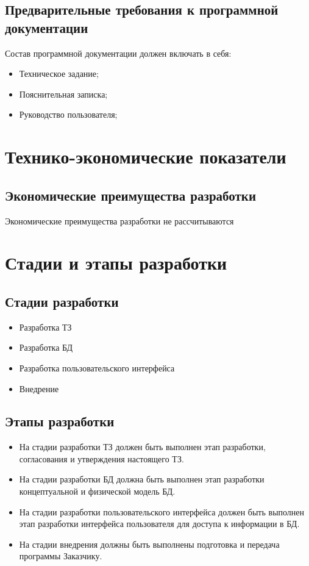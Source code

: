   \subsection{Предварительные требования к программной документации}
    Состав программной документации должен включать в себя:
    \begin{itemize}
    \item Техническое задание;
    \item Пояснительная записка;
    \item Руководство пользователя;
    \end{itemize}
\section{Технико-экономические показатели}
  \subsection{Экономические преимущества разработки}
    Экономические преимущества разработки не рассчитываются 
\section{Стадии и этапы разработки}
  \subsection{Стадии разработки}
   \begin{itemize}
    \item Разработка ТЗ
    \item Разработка БД
    \item Разработка пользовательского интерфейса
    \item Внедрение
  \end{itemize}
  \subsection{Этапы разработки}
  \begin{itemize}
    \item На стадии разработки ТЗ должен быть выполнен этап разработки, согласования и утверждения настоящего ТЗ.
    \item На стадии разработки БД должна быть выполнен этап разработки концептуальной и физической модель БД.
    \item На стадии разработки пользовательского интерфейса должен быть выполнен этап разработки интерфейса пользователя для доступа к информации в БД.
    \item На стадии внедрения должны быть выполнены подготовка и передача программы Заказчику.
  \end{itemize}
  
